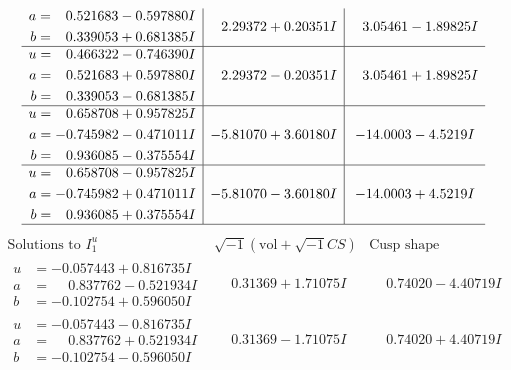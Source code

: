 \documentclass[1p]{elsarticle_modified}
\theoremstyle{definition}
\newcommand{\I}{\sqrt{-1}}
\begin{document}
$$\begin{array}{c|c|c}
\begin{aligned}
a &= \phantom{-}0.521683 - 0.597880 I \\
b &= \phantom{-}0.339053 + 0.681385 I\end{aligned}
 & \phantom{-}2.29372 + 0.20351 I & \phantom{-}3.05461 - 1.89825 I \\ \hline\begin{aligned}
u &= \phantom{-}0.466322 - 0.746390 I \\
a &= \phantom{-}0.521683 + 0.597880 I \\
b &= \phantom{-}0.339053 - 0.681385 I\end{aligned}
 & \phantom{-}2.29372 - 0.20351 I & \phantom{-}3.05461 + 1.89825 I \\ \hline\begin{aligned}
u &= \phantom{-}0.658708 + 0.957825 I \\
a &= -0.745982 - 0.471011 I \\
b &= \phantom{-}0.936085 - 0.375554 I\end{aligned}
 & -5.81070 + 3.60180 I & -14.0003 - 4.5219 I \\ \hline\begin{aligned}
u &= \phantom{-}0.658708 - 0.957825 I \\
a &= -0.745982 + 0.471011 I \\
b &= \phantom{-}0.936085 + 0.375554 I\end{aligned}
 & -5.81070 - 3.60180 I & -14.0003 + 4.5219 I\\
 \hline 
 \end{array}$$\newpage$$\begin{array}{c|c|c}  
\text{Solutions to }I^u_{1}& \I (\text{vol} + \sqrt{-1}CS) & \text{Cusp shape}\\
 \hline 
\begin{aligned}
u &= -0.057443 + 0.816735 I \\
a &= \phantom{-}0.837762 - 0.521934 I \\
b &= -0.102754 + 0.596050 I\end{aligned}
 & \phantom{-}0.31369 + 1.71075 I & \phantom{-}0.74020 - 4.40719 I \\ \hline\begin{aligned}
u &= -0.057443 - 0.816735 I \\
a &= \phantom{-}0.837762 + 0.521934 I \\
b &= -0.102754 - 0.596050 I\end{aligned}
 & \phantom{-}0.31369 - 1.71075 I & \phantom{-}0.74020 + 4.40719 I \\ \hline\begin{aligned}

\end{aligned}
\end{array}$$
\end{document}
